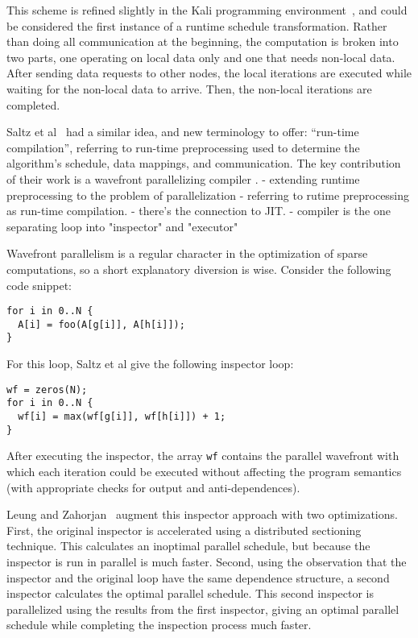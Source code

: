 This scheme is refined slightly in the Kali programming environment~\cite{koelbel1990supporting}, and could be considered the first instance of a runtime schedule transformation.
Rather than doing all communication at the beginning, the computation is broken into two parts, one operating on local data only and one that needs non-local data.
After sending data requests to other nodes, the local iterations are executed while waiting for the non-local data to arrive.
Then, the non-local iterations are completed.

Saltz et al~\cite{saltz1990run,saltz1991multiprocessors} had a similar idea, and new terminology to offer: \enquote{run-time compilation}, referring to run-time preprocessing used to determine the algorithm's schedule, data mappings, and communication.
The key contribution of their work is a wavefront parallelizing compiler .
- extending runtime preprocessing to the problem of parallelization
- referring to rutime preprocessing as run-time compilation. 
- there's the connection to JIT.
- compiler is the one separating loop into "inspector" and "executor"

Wavefront parallelism is a regular character in the optimization of sparse computations, so a short explanatory diversion is wise.
Consider the following code snippet:
\begin{lstlisting}
for i in 0..N {
  A[i] = foo(A[g[i]], A[h[i]]);
}
\end{lstlisting}
For this loop, Saltz et al give the following inspector loop:
\begin{lstlisting}
wf = zeros(N);
for i in 0..N {
  wf[i] = max(wf[g[i]], wf[h[i]]) + 1;
}
\end{lstlisting}

After executing the inspector, the array \verb.wf. contains the parallel wavefront with which each iteration could be executed without affecting the program semantics (with appropriate checks for output and anti-dependences). 

Leung and Zahorjan~\cite{leung1993improving} augment this inspector approach with two optimizations.
First, the original inspector is accelerated using a distributed sectioning technique. 
This calculates an inoptimal parallel schedule, but because the inspector is run in parallel is much faster.
Second, using the observation that the inspector and the original loop have the same dependence structure, a second inspector calculates the optimal parallel schedule.
This second inspector is parallelized using the results from the first inspector, giving an optimal parallel schedule while completing the inspection process much faster.


